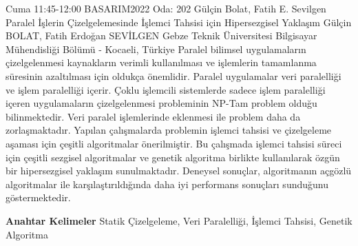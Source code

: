 
    \begin{abstract_basarim}
    {Cuma 11:45-12:00}
    {BASARIM2022}
    {Oda: 202}
    {Gülçin Bolat, Fatih E. Sevilgen}
    {Paralel İşlerin Çizelgelemesinde İşlemci Tahsisi için Hipersezgisel Yaklaşım}
    {%
    Gülçin BOLAT, Fatih Erdoğan SEVİLGEN}
    {%
    }
    {%
    Gebze Teknik Üniversitesi Bilgisayar Mühendisliği Bölümü - Kocaeli, Türkiye}
    Paralel bilimsel uygulamaların çizelgelenmesi kaynakların verimli kullanılması ve işlemlerin tamamlanma süresinin azaltılması için oldukça önemlidir. Paralel uygulamalar veri paralelliği ve işlem paralelliği içerir. Çoklu işlemcili sistemlerde sadece işlem paralelliği içeren uygulamaların çizelgelenmesi probleminin NP-Tam problem olduğu bilinmektedir. Veri paralel işlemlerinde eklenmesi ile problem daha da zorlaşmaktadır. Yapılan çalışmalarda problemin işlemci tahsisi ve çizelgeleme aşaması için çeşitli algoritmalar önerilmiştir. Bu çalışmada işlemci tahsisi süreci için çeşitli sezgisel algoritmalar ve genetik algoritma birlikte kullanılarak özgün bir hipersezgisel yaklaşım sunulmaktadır. Deneysel sonuçlar, algoritmanın açgözlü algoritmalar ile karşılaştırıldığında daha iyi performans sonuçları sunduğunu göstermektedir. 
    
            \textbf{Anahtar Kelimeler} \newline{}Statik Çizelgeleme, Veri Paralelliği, İşlemci Tahsisi, Genetik Algoritma
    \end{abstract_basarim}
    